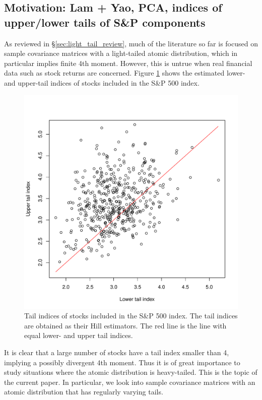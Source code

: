 \documentclass[11pt,reqno]{amsart}
\newcommand{\1}{\mathds{1}}
\newcommand{\0}{\boldsymbol{0}}
\newcommand{\4}{\mathchoice{\mskip1.5mu}{\mskip1.5mu}{}{}}
\newcommand{\5}{\mathchoice{\mskip-1.5mu}{\mskip-1.5mu}{}{}}
\newcommand{\2}{\penalty250\mskip\thickmuskip\mskip-\thinmuskip} %
\begin{document}
\subsection{Motivation: Lam + Yao, PCA, indices of upper/lower tails of S\&P
  components}
As reviewed in \S\ref{sec:light_tail_review}, much of the literature
so far is focused on sample covariance matrices with a light-tailed atomic
distribution, which in particular implies finite 4th moment. However,
this is untrue when real financial data such as stock returns are
concerned. Figure \ref{fig:SP500_tail_indices} shows the estimated
lower- and upper-tail indices of stocks included in the S\&P 500 index.
\begin{figure}[htb!]
  \centering
  \includegraphics[scale=0.5]{SP500_tail_indices.pdf}
  \caption{Tail indices of stocks included in the S\&P 500 index. The tail
    indices are obtained as their Hill estimators. The red line is the
    line with equal lower- and upper tail indices.}
  \label{fig:SP500_tail_indices}
\end{figure}
It is clear that a large number of stocks have a tail index smaller
than 4, implying a possibly divergent 4th moment. Thus it is of great
importance to study situations where the atomic distribution is
heavy-tailed. This is the topic of the current paper. In particular,
we look into sample covariance matrices with an atomic distribution
that has regularly varying tails.
\end{document}
